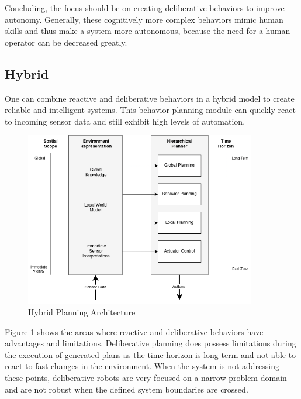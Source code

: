 Concluding, the focus should be on creating deliberative behaviors to improve autonomy. Generally, these cognitively more complex behaviors mimic human skills and thus make a system more autonomous, because the need for a human operator can be decreased greatly.

%

\subsection{Hybrid}

One can combine reactive and deliberative behaviors in a hybrid model to create reliable and intelligent systems. This behavior planning module can quickly react to incoming sensor data and still exhibit high levels of automation. 

\begin{figure}[ht]
	\centering
	\includegraphics[width=0.9\textwidth]{images/Deliberative_hierarchical_planning.png} 
	\caption{Hybrid Planning Architecture \cite{arkin1998}}
	\label{fig:hybrid_planning}
\end{figure}

Figure \ref{fig:hybrid_planning} shows the areas where reactive and deliberative behaviors have advantages and limitations. Deliberative planning does possess limitations during the execution of generated plans as the time horizon is long-term and not able to react to fast changes in the environment. When the system is not addressing these points, deliberative robots are very focused on a narrow problem domain and are not robust when the defined system boundaries are crossed\cite{arkin1998}.

